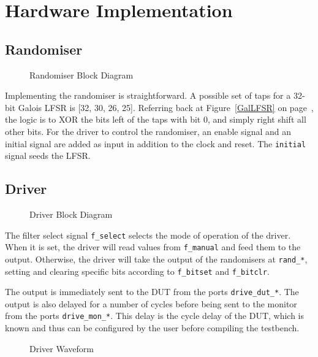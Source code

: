 \chapter{Hardware Implementation}

\section{Randomiser}

\begin{figure}[H]
  \centering
  
  \caption{Randomiser Block Diagram}
  \label{RandomiserBlk}
\end{figure}

Implementing the randomiser is straightforward.
A possible set of taps for a 32-bit Galois LFSR is [32, 30, 26, 25].
Referring back at Figure~\ref{GalLFSR} on page~\pageref{GalLFSR},
the logic is to XOR the bits left of the taps with bit 0, and simply right shift all other bits.
For the driver to control the randomiser, an enable signal and an initial signal are added as input in addition to the clock and reset.
The \texttt{initial} signal seeds the LFSR.

\section{Driver}

\begin{figure}[H]
  \centering
  
  \caption{Driver Block Diagram}
  \label{DriverBlk}
\end{figure}

The filter select signal \texttt{f\_select} selects the mode of operation of the driver.
When it is set, the driver will read values from \texttt{f\_manual} and feed them to the output.
Otherwise, the driver will take the output of the randomisers at \texttt{rand\_*}, setting and clearing specific bits according to \texttt{f\_bitset} and \texttt{f\_bitclr}.

The output is immediately sent to the DUT from the ports \texttt{drive\_dut\_*}.
The output is also delayed for a number of cycles before being sent to the monitor from the ports \texttt{drive\_mon\_*}.
This delay is the cycle delay of the DUT, which is known and thus can be configured by the user before compiling the testbench.

\begin{figure}[H]
  \centering
  
  \caption{Driver Waveform}
  \label{DriveWave}
\end{figure}

